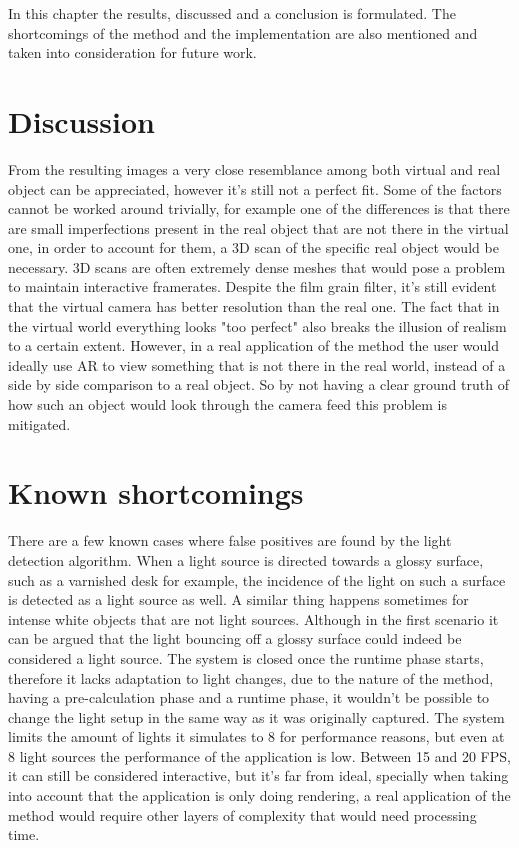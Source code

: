 In this chapter the results, discussed and a conclusion is formulated. The shortcomings of the method and the implementation are also mentioned and taken into consideration for future work.

\section{Discussion}
From the resulting images a very close resemblance among both virtual and real object can be appreciated, however it's still not a perfect fit. Some of the factors cannot be worked around trivially, for example one of the differences is that there are small imperfections present in the real object that are not there in the virtual one, in order to account for them, a 3D scan of the specific real object would be necessary. 3D scans are often extremely dense meshes that would pose a problem to maintain interactive framerates.\newline
Despite the film grain filter, it's still evident that the virtual camera has better resolution than the real one. The fact that in the virtual world everything looks "too perfect" also breaks the illusion of realism to a certain extent. However, in a real application of the method the user would ideally use AR to view something that is not there in the real world, instead of a side by side comparison to a real object. So by not having a clear ground truth of how such an object would look through the camera feed this problem is mitigated.

\section{Known shortcomings}
There are a few known cases where false positives are found by the light detection algorithm. When a light source is directed towards a glossy surface, such as a varnished desk for example, the incidence of the light on such a surface is detected as a light source as well. A similar thing happens sometimes for intense white objects that are not light sources. Although in the first scenario it can be argued that the light bouncing off a glossy surface could indeed be considered a light source. The system is closed once the runtime phase starts, therefore it lacks adaptation to light changes, due to the nature of the method, having a pre-calculation phase and a runtime phase, it wouldn't be possible to change the light setup in the same way as it was originally captured.\newline
The system limits the amount of lights it simulates to 8 for performance reasons, but even at 8 light sources the performance of the application is low. Between 15 and 20 FPS, it can still be considered interactive, but it's far from ideal, specially when taking into account that the application is only doing rendering, a real application of the method would require other layers of complexity that would need processing time.

